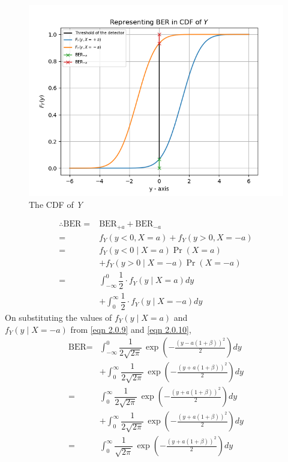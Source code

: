 \documentclass[journal,10pt,twocolumn]{IEEEtran}
\begin{document}
\begin{figure}
    \centering
	\includegraphics[width=\columnwidth]{./Figures/Figure_1.png}
    \caption{The CDF of \textit{Y}}
    \label{CDF_Y}
\end{figure}
\begin{align}
\therefore \text{BER} = {}& \text{BER}_{+a} + \text{BER}_{-a}\\
= {}& f_Y(y < 0, X = a) + f_Y(y>0, X = -a)\\
 = {}& f_Y(y<0\;|\;X = a) \Pr(X=a) \nonumber \\ &+ f_Y(y>0\;|\;X = -a) \Pr(X=-a)\\
 = {}& \int_{- \infty} ^ 0 \dfrac{1}{2} \cdot f_Y(y\;|\;X = a) dy \nonumber \\
 &+ \int_{0} ^{ \infty} \dfrac{1}{2} \cdot f_Y(y\;|\;X = -a) dy
\end{align}
On substituting the values of $f_Y(y\;|\;X=a)$ and\\
$f_Y(y\;|\;X=-a)$ from \ref{eqn 2.0.9} and \ref{eqn 2.0.10}, 
\begin{align}
\text{BER} = {}& \int_{- \infty } ^ 0 \dfrac{1}{2\sqrt{2\pi}}\,\exp \left(-\frac{(y - a(1 + \beta))^2}{2} \right) dy \nonumber \\
&+ \int_{0} ^ {\infty } \dfrac{1}{2\sqrt{2\pi}}\,\exp \left(-\frac{(y + a(1 + \beta))^2}{2} \right) dy\\
 = {}& \int_{0} ^ {\infty } \dfrac{1}{2\sqrt{2\pi}}\,\exp \left(-\frac{(y + a(1 + \beta))^2}{2} \right) dy \nonumber \\
 &+ \int_{0} ^ {\infty } \dfrac{1}{2\sqrt{2\pi}}\,\exp \left(-\frac{(y + a(1 + \beta))^2}{2} \right) dy\\
 = {}& \int_{0} ^ {\infty } \dfrac{1}{\sqrt{2\pi}}\,\exp \left(-\frac{(y + a(1 + \beta))^2}{2} \right) dy \label{eqn 2.0.19}
\end{align} 
\end{document}
